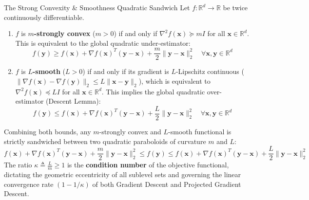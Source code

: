 \begin{theorembox}{The Strong Convexity \& Smoothness Quadratic Sandwich}
Let $f: \mathbb{R}^d \to \mathbb{R}$ be twice continuously differentiable.
\begin{enumerate}
    \item $f$ is \textbf{$m$-strongly convex} ($m > 0$) if and only if $\nabla^2 f(\mathbf{x}) \succeq m I$ for all $\mathbf{x} \in \mathbb{R}^d$. This is equivalent to the global quadratic under-estimator:
    \begin{equation}
    f(\mathbf{y}) \ge f(\mathbf{x}) + \nabla f(\mathbf{x})^T(\mathbf{y} - \mathbf{x}) + \frac{m}{2}\|\mathbf{y} - \mathbf{x}\|_2^2 \quad \forall \mathbf{x}, \mathbf{y} \in \mathbb{R}^d
    \label{eq:strong_convexity_lower}
    \end{equation}
    \item $f$ is \textbf{$L$-smooth} ($L > 0$) if and only if its gradient is $L$-Lipschitz continuous ($\|\nabla f(\mathbf{x}) - \nabla f(\mathbf{y})\|_2 \le L \|\mathbf{x} - \mathbf{y}\|_2$), which is equivalent to $\nabla^2 f(\mathbf{x}) \preceq L I$ for all $\mathbf{x} \in \mathbb{R}^d$. This implies the global quadratic over-estimator (Descent Lemma):
    \begin{equation}
    f(\mathbf{y}) \le f(\mathbf{x}) + \nabla f(\mathbf{x})^T(\mathbf{y} - \mathbf{x}) + \frac{L}{2}\|\mathbf{y} - \mathbf{x}\|_2^2 \quad \forall \mathbf{x}, \mathbf{y} \in \mathbb{R}^d
    \label{eq:smoothness_upper}
    \end{equation}
\end{enumerate}
Combining both bounds, any $m$-strongly convex and $L$-smooth functional is strictly sandwiched between two quadratic paraboloids of curvature $m$ and $L$:
\begin{equation}
f(\mathbf{x}) + \nabla f(\mathbf{x})^T(\mathbf{y} - \mathbf{x}) + \frac{m}{2}\|\mathbf{y} - \mathbf{x}\|_2^2 \le f(\mathbf{y}) \le f(\mathbf{x}) + \nabla f(\mathbf{x})^T(\mathbf{y} - \mathbf{x}) + \frac{L}{2}\|\mathbf{y} - \mathbf{x}\|_2^2
\label{eq:quadratic_sandwich}
\end{equation}
The ratio $\kappa \triangleq \frac{L}{m} \ge 1$ is the \textbf{condition number} of the objective functional, dictating the geometric eccentricity of all sublevel sets and governing the linear convergence rate $(1 - 1/\kappa)$ of both Gradient Descent and Projected Gradient Descent.
\end{theorembox}

